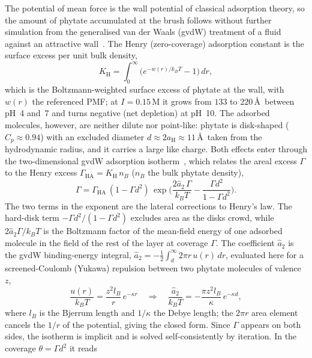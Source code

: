 \documentclass[11pt]{article}
\begin{document}
The potential of mean force is the wall potential of classical adsorption
theory, so the amount of phytate accumulated at the brush follows without
further simulation from the generalised van der Waals (gvdW) treatment of a
fluid against an attractive wall~\cite{Nordholm2018}.  The Henry (zero-coverage)
adsorption constant is the surface excess per unit bulk density,
\begin{equation}\label{eq:KH}
K_\text{H} = \int_0^\infty\!\big(e^{-w(r)/k_BT}-1\big)\,dr,
\end{equation}
which is the Boltzmann-weighted surface excess of phytate at the wall, with
$w(r)$ the referenced PMF; at $I=0.15$\,M it grows from $133$ to $220$\,\AA\ between pH~4
and~7 and turns negative (net depletion) at pH~10.  The adsorbed molecules,
however, are neither dilute nor point-like: phytate is disk-shaped
($C_p\approx0.94$) with an excluded diameter $d\approx2a_\text{H}\approx11$\,\AA\
taken from the hydrodynamic radius, and it carries a large like charge.  Both
effects enter through the two-dimensional gvdW adsorption
isotherm~\cite{Nordholm2018}, which relates the areal excess $\Gamma$ to the
Henry excess $\Gamma_\text{HA}=K_\text{H}\,n_B$ ($n_B$ the bulk phytate
density),
\begin{equation}\label{eq:isotherm}
\Gamma = \Gamma_\text{HA}\,(1-\Gamma d^2)\,
         \exp\!\Big(\frac{2\hat a_2\,\Gamma}{k_BT}
                    -\frac{\Gamma d^2}{1-\Gamma d^2}\Big).
\end{equation}
The two terms in the exponent are the lateral corrections to Henry's law.  The
hard-disk term $-\Gamma d^2/(1-\Gamma d^2)$ excludes area as the disks crowd,
while $2\hat a_2\Gamma/k_BT$ is the Boltzmann factor of the mean-field energy of
one adsorbed molecule in the field of the rest of the layer at coverage
$\Gamma$.  The coefficient $\hat a_2$ is the gvdW binding-energy integral,
$\hat a_2 = -\tfrac12\int_d^\infty 2\pi r\,u(r)\,dr$, evaluated here for a
screened-Coulomb (Yukawa) repulsion between two phytate molecules of valence
$z$,
\begin{equation}\label{eq:a2}
\frac{u(r)}{k_BT} = \frac{z^2 l_B}{r}\,e^{-\kappa r}
\quad\Longrightarrow\quad
\frac{\hat a_2}{k_BT} = -\frac{\pi z^2 l_B}{\kappa}\,e^{-\kappa d},
\end{equation}
where $l_B$ is the Bjerrum length and $1/\kappa$ the Debye length; the $2\pi r$
area element cancels the $1/r$ of the potential, giving the closed form.  Since
$\Gamma$ appears on both sides, the isotherm is implicit and is solved
self-consistently by iteration.  In the coverage $\theta=\Gamma d^2$ it reads
\end{document}
